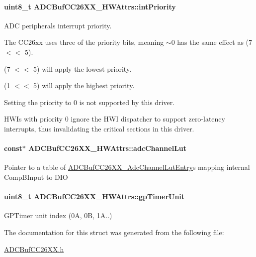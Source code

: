 \paragraph[{int\+Priority}]{\setlength{\rightskip}{0pt plus 5cm}uint8\+\_\+t A\+D\+C\+Buf\+C\+C26\+X\+X\+\_\+\+H\+W\+Attrs\+::int\+Priority}\label{struct_a_d_c_buf_c_c26_x_x___h_w_attrs_a8f26b88e0b885debb7659c20f719dce9}


A\+D\+C peripheral\textquotesingle{}s interrupt priority. 

The C\+C26xx uses three of the priority bits, meaning $\sim$0 has the same effect as (7 $<$$<$ 5).

(7 $<$$<$ 5) will apply the lowest priority.

(1 $<$$<$ 5) will apply the highest priority.

Setting the priority to 0 is not supported by this driver.

H\+W\+I\textquotesingle{}s with priority 0 ignore the H\+W\+I dispatcher to support zero-\/latency interrupts, thus invalidating the critical sections in this driver. 
\paragraph[{adc\+Channel\+Lut}]{ const$\ast$ A\+D\+C\+Buf\+C\+C26\+X\+X\+\_\+\+H\+W\+Attrs\+::adc\+Channel\+Lut}\label{struct_a_d_c_buf_c_c26_x_x___h_w_attrs_ad157d7e25bef35c76f3ae92bd912b109}
Pointer to a table of \hyperlink{struct_a_d_c_buf_c_c26_x_x___adc_channel_lut_entry}{A\+D\+C\+Buf\+C\+C26\+X\+X\+\_\+\+Adc\+Channel\+Lut\+Entry}\textquotesingle{}s mapping internal Comp\+B\+Input to D\+I\+O 
\paragraph[{gp\+Timer\+Unit}]{\setlength{\rightskip}{0pt plus 5cm}uint8\+\_\+t A\+D\+C\+Buf\+C\+C26\+X\+X\+\_\+\+H\+W\+Attrs\+::gp\+Timer\+Unit}\label{struct_a_d_c_buf_c_c26_x_x___h_w_attrs_aa3672991bcc912125a7faca2befbb7d1}
G\+P\+Timer unit index (0\+A, 0\+B, 1\+A..) 

The documentation for this struct was generated from the following file\+:\begin{DoxyCompactItemize}
\item 
\hyperlink{_a_d_c_buf_c_c26_x_x_8h}{A\+D\+C\+Buf\+C\+C26\+X\+X.\+h}\end{DoxyCompactItemize}
